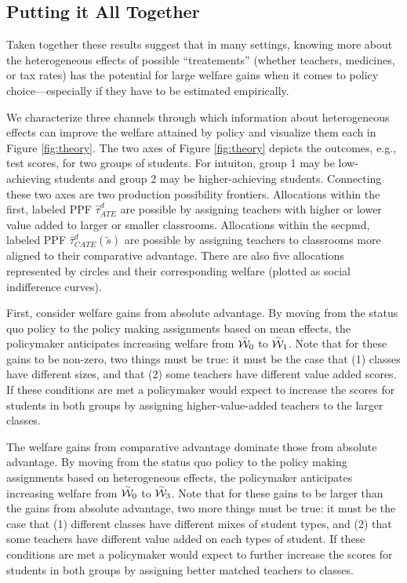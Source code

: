 \documentclass[12pt]{article}
\theoremstyle{definition}
\theoremstyle{definition}
\theoremstyle{definition}
\theoremstyle{definition}
\begin{document}
\subsection{Putting it All Together}
Taken together these results suggest that in many settings, knowing more about the heterogeneous effects of possible ``treatements'' (whether teachers, medicines, or tax rates) has the potential for large welfare gains when it comes to policy choice---especially if they have to be estimated empirically.


We characterize three channels through which information about heterogeneous effects can improve the welfare attained by policy and visualize them each in Figure \ref{fig:theory}. The two axes of Figure \ref{fig:theory} depicts the outcomes, e.g., test scores, for two groups of students. For intuiton, group 1 may be low-achieving students and group 2 may be higher-achieving students. Connecting these two axes are two production possibility frontiers. Allocations within the first, labeled PPF $\hat{\tau}^d_{ATE}$ are possible by assigning teachers with higher or lower value added to larger or smaller classrooms. Allocations within the secpmd, labeled PPF $\hat{\tau}^d_{CATE}(\tilde{s})$ are possible by assigning teachers to classrooms more aligned to their comparative advantage. There are also five allocations represented by circles and their corresponding welfare (plotted as social indifference curves).

First, consider welfare gains from absolute advantage. By moving from the status quo policy to the policy making assignments based on mean effects, the policymaker anticipates increasing welfare from $\accentset{\sim}{\mathcal{W}}_0$ to $\accentset{\sim}{\mathcal{W}}_1$. Note that for these gains to be non-zero, two things must be true: it must be the case that (1) classes have different sizes, and that (2) some teachers have different value added scores. If these conditions are met a policymaker would expect to  increase the scores for students in both groups by assigning higher-value-added teachers to the larger classes.

The welfare gains from comparative advantage dominate those from absolute advantage. By moving from the status quo policy to the policy making assignments based on heterogeneous effects, the policymaker anticipates increasing welfare from $\accentset{\sim}{\mathcal{W}}_0$ to $\accentset{\sim}{\mathcal{W}}_3$. Note that for these gains to be larger than the gains from absolute advantage, two more things must be true: it must be the case that  (1) different classes have different mixes of student types, and (2) that some teachers have different value added on each types of student. If these conditions are met a policymaker would expect to further increase the scores for students in both groups by assigning better matched teachers to classes.
\end{document}
